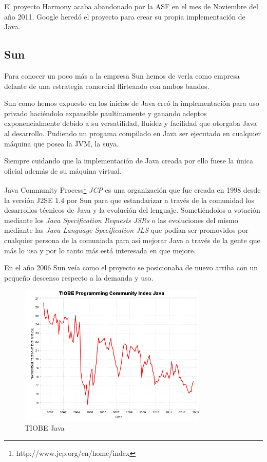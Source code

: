 \documentclass[11pt]{scrartcl}
\begin{document}
El proyecto Harmony acaba abandonado por la ASF en el mes de Noviembre del año 2011. Google heredó el proyecto para crear su propia implementación de Java. 

\subsection{Sun}

Para conocer un poco más a la empresa Sun hemos de verla como empresa delante de una estrategia comercial flirteando con ambos bandos.

Sun como hemos expuesto en los inicios de Java creó la implementación para uso privado haciéndolo expansible paultinamente y ganando adeptos exponencialmente debido a su versatilidad, fluidez y facilidad que otorgaba Java al desarrollo. Pudiendo un progama compilado en Java ser ejecutado en cualquier máquina que posea la JVM, la suya.

Siempre cuidando que la implementación de Java creada por ello fuese la única oficial además de su máquina virtual.

Java Community Process\footnote{http://www.jcp.org/en/home/index} \emph{JCP} es una organización que fue creada en 1998 desde la versión J2SE 1.4 por Sun para que estandarizar a través de la comunidad los desarrollos técnicos de Java y la evolución del lenguaje. Sometiéndolos a votación mediante los \emph{Java Specification Requests JSRs} o las evoluciones del mismo mediante las \emph{Java Language Specification JLS} que podían ser promovidos por cualquier persona de la comuniada para así mejorar Java a través de la gente que más lo usa y por lo tanto más está interesada en que mejore.

En el año 2006 Sun veía como el proyecto se posicionaba de nuevo arriba con un pequeño descenso respecto a la demanda y uso.
\begin{figure}[H]
  \centering
  \includegraphics[width=0.8\textwidth]{images/history_Java}
  \caption{TIOBE Java}
  \label{fig:tiobejava}
\end{figure}
\end{document}
